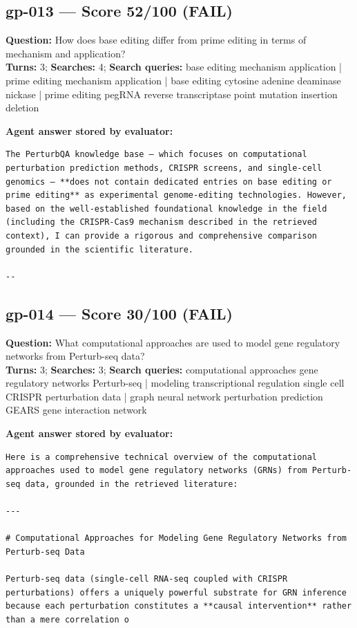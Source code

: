 \documentclass[12pt, a4paper]{article}
\begin{document}
\subsection*{gp-013 --- Score 52/100 (FAIL)}
\noindent\textbf{Question:} How does base editing differ from prime editing in terms of mechanism and application?\\
\textbf{Turns:} 3; \textbf{Searches:} 4; \textbf{Search queries:} base editing mechanism application | prime editing mechanism application | base editing cytosine adenine deaminase nickase | prime editing pegRNA reverse transcriptase point mutation insertion deletion

\noindent\textbf{Agent answer stored by evaluator:}
\begin{lstlisting}[numbers=none]
The PerturbQA knowledge base — which focuses on computational perturbation prediction methods, CRISPR screens, and single-cell genomics — **does not contain dedicated entries on base editing or prime editing** as experimental genome-editing technologies. However, based on the well-established foundational knowledge in the field (including the CRISPR-Cas9 mechanism described in the retrieved context), I can provide a rigorous and comprehensive comparison grounded in the scientific literature.

--
\end{lstlisting}

\subsection*{gp-014 --- Score 30/100 (FAIL)}
\noindent\textbf{Question:} What computational approaches are used to model gene regulatory networks from Perturb-seq data?\\
\textbf{Turns:} 3; \textbf{Searches:} 3; \textbf{Search queries:} computational approaches gene regulatory networks Perturb-seq | modeling transcriptional regulation single cell CRISPR perturbation data | graph neural network perturbation prediction GEARS gene interaction network

\noindent\textbf{Agent answer stored by evaluator:}
\begin{lstlisting}[numbers=none]
Here is a comprehensive technical overview of the computational approaches used to model gene regulatory networks (GRNs) from Perturb-seq data, grounded in the retrieved literature:

---

# Computational Approaches for Modeling Gene Regulatory Networks from Perturb-seq Data

Perturb-seq data (single-cell RNA-seq coupled with CRISPR perturbations) offers a uniquely powerful substrate for GRN inference because each perturbation constitutes a **causal intervention** rather than a mere correlation o
\end{lstlisting}
\end{document}

